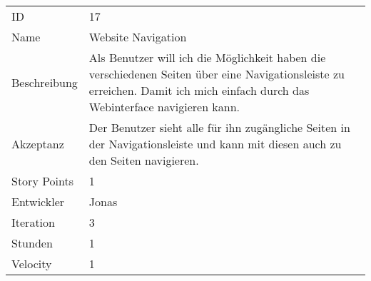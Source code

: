 \begin{table}[htbp]
\begin{minipage}{\linewidth}
\setlength{\tymax}{0.5\linewidth}
\centering
\small
\begin{tabulary}{\textwidth}{|l| p{10cm}|} \toprule
ID   &17\\


Name  &Website Navigation\\
Beschreibung&Als Benutzer will ich die Möglichkeit haben die verschiedenen Seiten über eine Navigationsleiste zu erreichen. Damit ich mich einfach durch das Webinterface navigieren kann.\\
Akzeptanz &Der Benutzer sieht alle für ihn zugängliche Seiten in der Navigationsleiste und kann mit diesen auch zu den Seiten navigieren.\\
Story Points&1\\
Entwickler &Jonas\\
Iteration &3\\
Stunden  &1\\
Velocity &1\\
\bottomrule

\end{tabulary}
\end{minipage}
\end{table}



